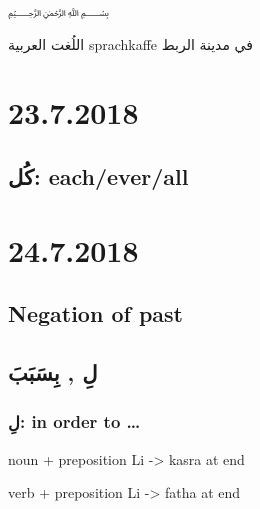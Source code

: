 \documentclass[a4paper]{article}
\begin{document}
﷽


\begin{center}
  اللُغت العربية \textenglish{sprachkaffe}  في مدينة الربط
\end{center}

\section{\textenglish{23.7.2018}}

\subsection{كُل: \textenglish{each/ever/all}}


\section{\textenglish{24.7.2018}}
\subsection{\textenglish{Negation of past}}


\subsection{لِ , بِسَبَبَ}

\subsubsection{لِ: \textenglish{in order to \ldots}}

\textenglish{noun + preposition Li -> kasra at end}

\textenglish{verb + preposition Li -> fatha at end}  
\end{document}

